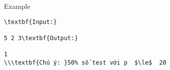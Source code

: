 Example
\begin{verbatim}
\textbf{Input:}

5 2 3\textbf{Output:}

1
\\\textbf{Chú ý: }50% số test với p  $\le$  20
\end{verbatim}